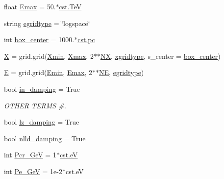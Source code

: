 \begin{DoxyCompactItemize}
float \hyperlink{namespacenamelist__uniform_aea587487093a8523b1e57e0eba597155}{Emax} = 50.$\ast$\hyperlink{constants_8h_a7f801e1f6821bc6baf0652ed2496e5e9}{cst.\+TeV}
\item 
string \hyperlink{namespacenamelist__uniform_a09d1021139053cd3ea6f5263f08b418a}{egridtype} = \char`\"{}logspace\char`\"{}
\item 
int \hyperlink{namespacenamelist__uniform_a81530466fd9deb997c3202e5c8325938}{box\+\_\+center} = 1000.$\ast$\hyperlink{constants_8h_a2884cd030c4c825754349a525a1d06ce}{cst.\+pc}
\item 
\hyperlink{namespacenamelist__uniform_ac57abe57ed039db9d3b98a9a732ae972}{X} = grid.\+grid(\hyperlink{namespacenamelist__uniform_a7c7288ff312320da0dc2935e7c21279b}{Xmin}, \hyperlink{namespacenamelist__uniform_a5a929208e654614b50cd847076017faf}{Xmax}, 2$\ast$$\ast$\hyperlink{namespacenamelist__uniform_acac19d7f367bfd5436353d2252c045cc}{NX}, \hyperlink{namespacenamelist__uniform_a1bc8692763d4f8bb07a80e0724b8add8}{xgridtype}, s\+\_\+center = \hyperlink{namespacenamelist__uniform_a81530466fd9deb997c3202e5c8325938}{box\+\_\+center})
\item 
\hyperlink{namespacenamelist__uniform_ae326a4c58a1bf2113624ca242b164c87}{E} = grid.\+grid(\hyperlink{namespacenamelist__uniform_a32b39233fb12d5ffbaa3a950a1286f88}{Emin}, \hyperlink{namespacenamelist__uniform_aea587487093a8523b1e57e0eba597155}{Emax}, 2$\ast$$\ast$\hyperlink{namespacenamelist__uniform_a9a7501e0271bf9c456a9be1b666c1018}{NE}, \hyperlink{namespacenamelist__uniform_a09d1021139053cd3ea6f5263f08b418a}{egridtype})
\item 
bool \hyperlink{namespacenamelist__uniform_a822ee62cab9aacc90a5856de0df8d348}{in\+\_\+damping} = True
\begin{DoxyCompactList}\small\item\em O\+T\+H\+ER T\+E\+R\+MS \#. \end{DoxyCompactList}\item 
bool \hyperlink{namespacenamelist__uniform_abc4b9264ea677ba31f7971917e120c8b}{lz\+\_\+damping} = True
\item 
bool \hyperlink{namespacenamelist__uniform_a44c42590c94f5a2b3cd6b5a399f630ba}{nlld\+\_\+damping} = True
\item 
int \hyperlink{namespacenamelist__uniform_abb7a1f5c6d953b1c315d46f21c8b46a5}{Pcr\+\_\+GeV} = 1$\ast$\hyperlink{constants_8h_a87b385f118e3715860117a77eda7136d}{cst.\+eV}
\item 
int \hyperlink{namespacenamelist__uniform_a7bbc46f7d53cc0d4c7aab507cd755aef}{Pe\+\_\+GeV} = 1e-\/2$\ast$cst.\+eV

\end{DoxyCompactItemize}
